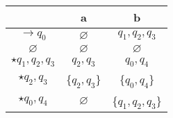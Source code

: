 \documentclass[12pt, a4paper, openany, oneside]{book}
\begin{document}
\begin{center}
\begin{tabular}{ |c|c|c| } 
\hline
~ & a & b \\ 
\hline
$\to {q_{0}}$ & $\varnothing$ & ${q_{1}, q_{2}, q_{3}}$ \\ 
$\varnothing$ & $\varnothing$ & $\varnothing$ \\
$\star {q_{1}, q_{2}, q_{3}}$ & ${q_{2}, q_{3}}$ & ${q_{0}, q_{4}}$\\  
$\star {q_{2}, q_{3}}$ & \{${q_{2}, q_{3}}$\} & \{$q_{0}, q_{4}$\} \\
$\star {q_{0}, q_{4}}$ & $\varnothing$ & \{$q_{1}, q_{2}, q_{3}$\} \\
\hline
\end{tabular}
\end{center}  
\end{document}
